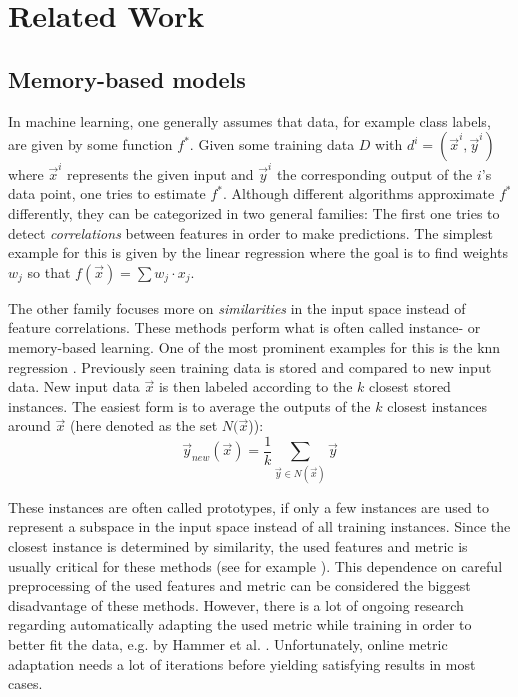 \chapter{Related Work \label{chap:stateOfTheArt}}



\section{Memory-based models}

In machine learning, one generally assumes that data, for example class labels, are given by some function $f^*$. Given some training data $D$ with $d^i =(\vec{x}^i,\vec{y}^i)$ where $\vec{x}^i$ represents the given input and $\vec{y}^i$ the corresponding output of the $i$'s data point, one tries to estimate $f^*$. 
Although different algorithms approximate $f^*$ differently, they can be categorized in two general families: The first one tries to detect \textit{correlations} between features in order to make predictions. The simplest example for this is given by the linear regression \cite{linearRegression} where the goal is to find weights $w_j$ so that $f(\vec{x}) = \sum w_j \cdot x_j$.

The other family focuses more on \textit{similarities} in the input space instead of feature correlations. These methods perform what is often called instance- or memory-based learning. One of the most prominent examples for this is the \gls{knn} regression \cite{kibler1987learning}. Previously seen training data is stored and compared to new input data. New input data $\vec{x}$ is then labeled according to the $k$ closest stored instances. The easiest form is to average the outputs of the $k$ closest instances around $\vec{x}$ (here denoted as the set $N(\vec{x}$)):
\begin{equation}
\vec{y}_{new}(\vec{x}) = \frac{1}{k} \sum_{\vec{y} \in N(\vec{x})} \vec{y}
\end{equation}

These instances are often called prototypes, if only a few instances are used to represent a subspace in the input space instead of all training instances. Since the closest instance is determined by similarity, the used features and metric is usually critical for these methods (see for example \cite{metric1, metric2}). This dependence on careful preprocessing of the used features and metric can be considered the biggest disadvantage of these methods. However, there is a lot of ongoing research regarding automatically adapting the used metric while training in order to better fit the data, e.g. by Hammer et al. \cite{lvq}. Unfortunately, online metric adaptation needs a lot of iterations before yielding satisfying results in most cases. 

